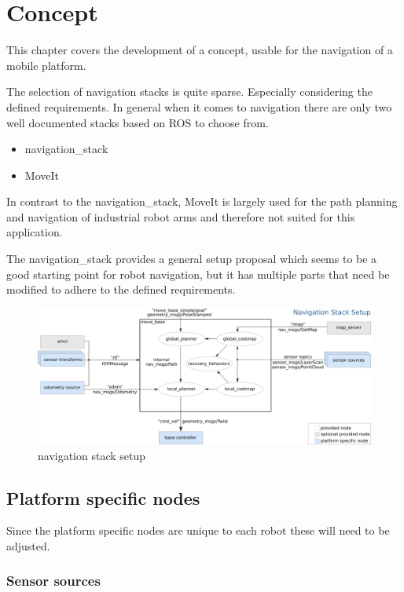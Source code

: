 \chapter{Concept}
\label{Concept}

This chapter covers the development of a concept, usable for the navigation of a mobile platform. 

The selection of navigation stacks is quite sparse. Especially considering the defined requirements. In general when it comes to navigation there are only two well documented stacks based on ROS to choose from.

\begin{itemize}
	\item navigation\_stack
	\item MoveIt
\end{itemize}

In contrast to the navigation\_stack, MoveIt is largely used for the path planning and navigation of industrial robot arms and therefore not suited for this application.

The navigation\_stack provides a general setup proposal which seems to be a good starting point for robot navigation, but it has multiple parts that need be modified to adhere to the defined requirements.

\begin{figure}[H]
	\centering
	\includegraphics[width=\textwidth]{Pictures/navigation stack setup}
	\caption{navigation stack setup\cite{movebase}}
	
	\label{navigation stack setup}
\end{figure}


\section{Platform specific nodes}
Since the platform specific nodes are unique to each robot these will need to be adjusted.\\
\subsection{Sensor sources}

